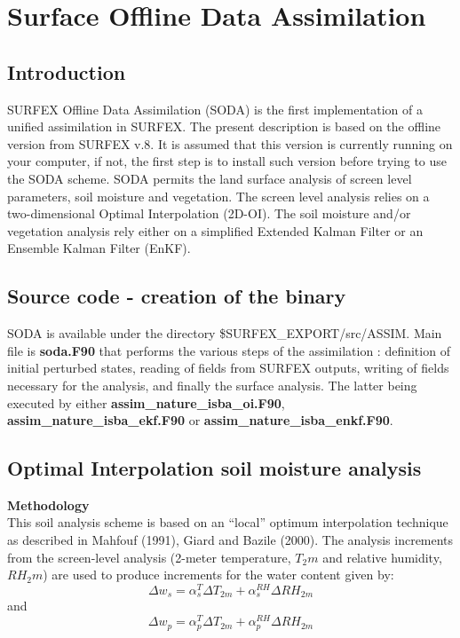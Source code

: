 \chapter{Surface Offline Data Assimilation}
\minitoc


\section{Introduction}
SURFEX Offline Data Assimilation (SODA) is the first implementation of a unified assimilation in SURFEX. The present description is based on the offline version from SURFEX v.8. It is assumed that this version is currently running on your computer, if not, the first step is to install such version before trying to use the SODA scheme. SODA permits the land surface analysis of screen level parameters, soil moisture and vegetation. The screen level analysis relies on a two-dimensional Optimal Interpolation (2D-OI). The soil moisture and/or vegetation analysis rely either on a simplified Extended Kalman Filter or an Ensemble Kalman Filter (EnKF).

\section{Source code - creation of the binary}
SODA is available under the directory \$SURFEX\_EXPORT/src/ASSIM. Main file is {\bf soda.F90} that performs the various steps of the assimilation : definition of initial perturbed states, reading of fields from SURFEX outputs, writing of fields necessary for the analysis, and finally the surface analysis. The latter being executed by either {\bf assim\_nature\_isba\_oi.F90}, {\bf assim\_nature\_isba\_ekf.F90} or {\bf assim\_nature\_isba\_enkf.F90}.

\section{Optimal Interpolation soil moisture analysis}
{\large {\bf Methodology}} \\
This soil analysis scheme is based on an “local” optimum interpolation technique as described in Mahfouf (1991)\nocite{mahfouf_1991}, Giard and Bazile (2000)\nocite{giard_bazile_00}. The analysis increments from the screen-level analysis (2-meter temperature, $T_2m$ and relative humidity, $RH_2m$) are used to produce increments for the water content given by: \\
\begin{equation}
\Delta w_{s} = \alpha_s^T  \Delta T_{2m} + \alpha_s^{RH} \Delta RH_{2m}
\end{equation}
and
\begin{equation}
\Delta w_{p} = \alpha_p^T  \Delta T_{2m} + \alpha_p^{RH} \Delta RH_{2m}
\end{equation}

